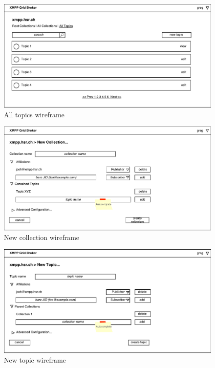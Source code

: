 \begin{figure}[h]
    \centering
    \includegraphics[width=1\linewidth]{resources/wireframe_4}
    \caption{All topics wireframe}
\end{figure}

\begin{figure}[h]
    \centering
    \includegraphics[width=1\linewidth]{resources/wireframe_5}
    \caption{New collection wireframe}
\end{figure}

\begin{figure}[h]
    \centering
    \includegraphics[width=1\linewidth]{resources/wireframe_6}
    \caption{New topic wireframe}
\end{figure}

